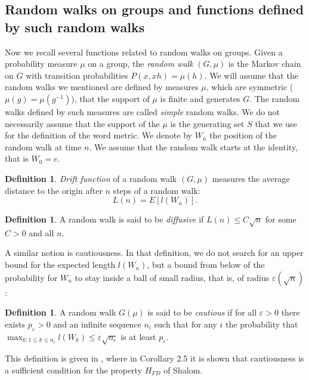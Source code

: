 \documentclass{amsart}
\numberwithin{figure}{section}
\theoremstyle{plain}
\theoremstyle{definition}
\newtheorem{definition}[thm]{Definition}
\begin{document}
\subsection{Random walks on groups and functions defined by such random walks}

Now we recall several functions related to random walks on groups.
Given a probability  measure $\mu$ on a group, the {\it random walk} $(G,\mu)$  is the Markov chain on $G$ with transition probabilities $P(x, xh)= \mu(h)$. 
We will assume that the random walks we mentioned are defined by measures $\mu$, which are symmetric ($\mu(g) = \mu(g^{-1})$), that the support  of $\mu$ is finite and generates $G$. The random walks defined by such measures are called {\it simple} random walks.
We do not necessarily assume that the support of the $\mu$ is the generating set $S$ that we use for the definition of the word metric.
We denote by $W_n$ the position  of the random 
walk at time $n$. We assume that the random walk 
starts at the identity, that is $W_0=e$.

\begin{definition} {\it Drift function} of a random walk $(G,\mu)$  measures the average distance to the origin after $n$ steps of a random walk:
$$
L(n) = E[l(W_n)]. 
$$

\end{definition}

\begin{definition}
A random walk is said to be {\it diffusive} if $L(n) \le C \sqrt{n}$ for some $C>0$ and all $n$.

\end{definition}

A similar notion is  cautiousness. In that definition, we do not search for an upper bound for the expected length $l(W_n)$, but a bound from below of the probability for $W_n$ to stay inside  a ball of small radius, that is, of radius $ \varepsilon (\sqrt{n})$:

\begin{definition}
A random walk $G(\mu)$ is said to be {\it cautious} if for all $\varepsilon>0$ there exists $p_{\varepsilon} >0$ and an infinite sequence $n_i$
such that for any $i$ the probability that $\max_{k: 1\le k \le n_i}l(W_{k}) \le \varepsilon \sqrt{n_i} $ is at least $p_{\varepsilon}$.
\end{definition}
This definition is given in \cite{erschlerozawa}, where in Corollary 2.5 it is shown that cautiousness is a sufficient condition for the property $H_{FD}$ of Shalom.
\end{document}
